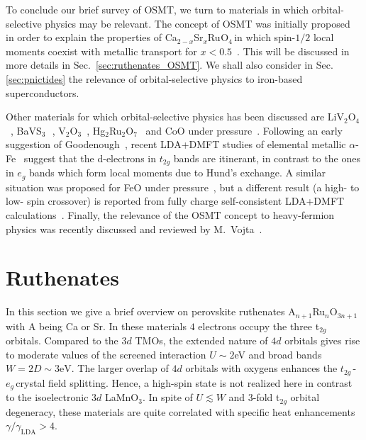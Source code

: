 \documentclass[]{ar2e-changed}%
\def\ttg{$t_{2g}\,$}
\def\eg{$e_{g}\,$}
\def\LiVO{LiV$_2$O$_4$\,}
\def\BaVS{BaVS$_3$\,}
\def\CSROtwo{Ca$_{2-x}$Sr$_{x}$Ru$_{}$O$_{4}$\,}
\begin{document}
To conclude our brief survey of OSMT, we turn to materials in which orbital-selective physics 
may be relevant. 
%
The concept of OSMT was initially proposed~\cite{Anisimov_OSMT} in order to 
explain the properties of \CSROtwo in which spin-$1/2$ local moments 
coexist with metallic transport for $x<0.5$~\cite{nakatsuji_prb_2000,nakatsuji_prl_2000,nakatsuji_prl_2003}. 
This will be discussed in more details in Sec.~\ref{sec:ruthenates_OSMT}. We shall also 
consider in Sec.\ref{sec:pnictides} the relevance of orbital-selective physics to iron-based superconductors. 

Other materials for which orbital-selective physics has been discussed are
\LiVO~\cite{anisimov_LiV2O4_prl_1999,singh_LiV2O4_prb_1999}, 
\BaVS~\cite{Lechermann_BaVS3_prl}, 
V$_2$O$_3$~\cite{Laad_V2O3,Poteryaev_V2O3},
Hg$_2$Ru$_2$O$_7$~\cite{Craco_Hg2Ru2O7} and CoO under
pressure~\cite{Huang_CoO_OSMT}. 
%
Following an early suggestion of Goodenough~\cite{goodenough_transition_metals_pr_1960}, 
recent LDA+DMFT studies of elemental metallic $\alpha$-Fe~\cite{Katanin_Iron} suggest that the 
d-electrons in $t_{2g}$ bands are itinerant, in contrast to the ones in $e_g$ bands
which form local moments due to Hund's exchange.  A similar situation was proposed for FeO
under pressure~\cite{Shorikov_FeO}, but a different result (a
high- to low- spin crossover) is reported from fully charge self-consistent LDA+DMFT calculations~\cite{Ohta_FeO}. 
%
Finally, the relevance of the OSMT concept to heavy-fermion physics was recently discussed and reviewed 
by M.~Vojta~\cite{vojta_OSMT_heavy_fermions_review_jltp_2010}. 

\section{Ruthenates}
\label{sec:ruthenates}

In this section we give a brief overview on perovskite ruthenates
A$_{n+1}$Ru$_n$O$_{3n+1}$ with A being Ca or Sr. In these materials $4$ 
electrons occupy the three t$_{2g}$ orbitals. Compared to the $3d$ TMOs, 
the extended nature of $4d$ orbitals gives rise
to moderate values of the screened interaction $U \sim 2$eV and broad
bands $W=2D\sim 3\mathrm{eV}$. The larger overlap of $4d$ orbitals with
oxygens enhances the \ttg- \eg crystal field splitting. Hence, a  
high-spin state is not realized here in contrast to the isoelectronic $3d$ LaMnO$_3$.  
%
In spite of $U\lesssim W$ and 3-fold t$_{2g}$ orbital
degeneracy, these materials are quite correlated with specific heat
enhancements $\gamma/\gamma_\mathrm{LDA}>4$.
\end{document}
